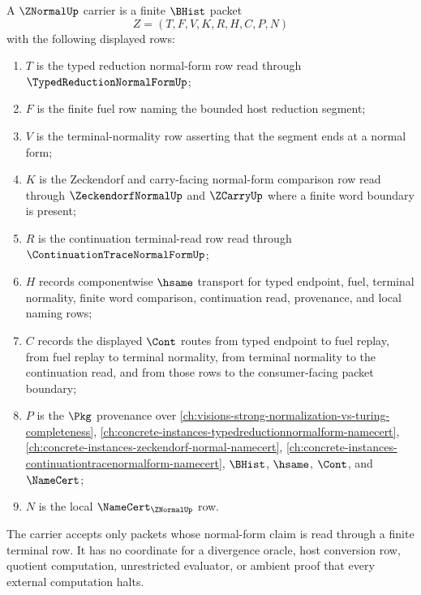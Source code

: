 \begin{definition}
\label{def:znormal-carrier}
A $\ZNormalUp$ carrier is a finite $\BHist$ packet
$$
Z=(T,F,V,K,R,H,C,P,N)
$$
with the following displayed rows:
\begin{enumerate}
\item $T$ is the typed reduction normal-form row read through $\TypedReductionNormalFormUp$;
\item $F$ is the finite fuel row naming the bounded host reduction segment;
\item $V$ is the terminal-normality row asserting that the segment ends at a normal form;
\item $K$ is the Zeckendorf and carry-facing normal-form comparison row read through $\ZeckendorfNormalUp$ and $\ZCarryUp$ where a finite word boundary is present;
\item $R$ is the continuation terminal-read row read through $\ContinuationTraceNormalFormUp$;
\item $H$ records componentwise $\hsame$ transport for typed endpoint, fuel, terminal normality, finite word comparison, continuation read, provenance, and local naming rows;
\item $C$ records the displayed $\Cont$ routes from typed endpoint to fuel replay, from fuel replay to terminal normality, from terminal normality to the continuation read, and from those rows to the consumer-facing packet boundary;
\item $P$ is the $\Pkg$ provenance over \autoref{ch:visions-strong-normalization-vs-turing-completeness}, \autoref{ch:concrete-instances-typedreductionnormalform-namecert}, \autoref{ch:concrete-instances-zeckendorf-normal-namecert}, \autoref{ch:concrete-instances-continuationtracenormalform-namecert}, $\BHist$, $\hsame$, $\Cont$, and $\NameCert$;
\item $N$ is the local $\NameCert_{\ZNormalUp}$ row.
\end{enumerate}
The carrier accepts only packets whose normal-form claim is read through a finite terminal row. It has no coordinate for a divergence oracle, host conversion row, quotient computation, unrestricted evaluator, or ambient proof that every external computation halts.
\end{definition}

